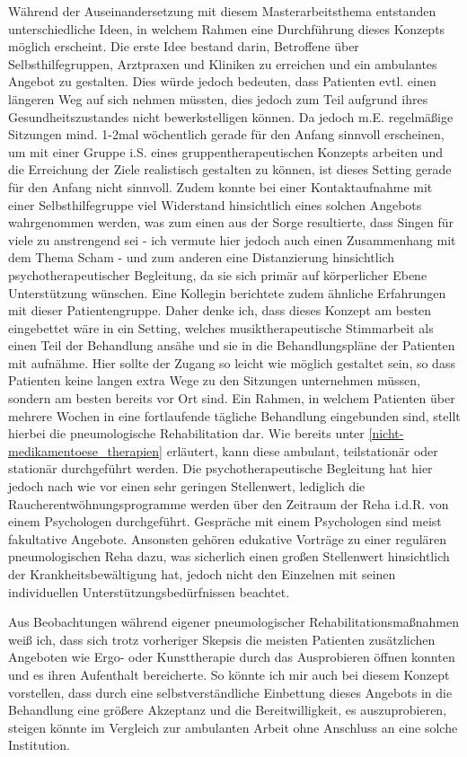 Während der Auseinandersetzung mit diesem Masterarbeitsthema entstanden unterschiedliche Ideen, in welchem Rahmen eine Durchführung dieses Konzepts möglich erscheint.
Die erste Idee bestand darin, Betroffene über Selbsthilfegruppen, Arztpraxen und Kliniken zu erreichen und ein ambulantes Angebot zu gestalten. Dies würde jedoch bedeuten, dass Patienten evtl. einen längeren Weg auf sich nehmen müssten, dies jedoch zum Teil aufgrund ihres Gesundheitszustandes nicht bewerkstelligen können. Da  jedoch m.E. regelmäßige Sitzungen mind. 1-2mal wöchentlich gerade für den Anfang sinnvoll erscheinen, um mit einer Gruppe i.S. eines gruppentherapeutischen Konzepts arbeiten und die Erreichung der Ziele realistisch gestalten zu können, ist dieses Setting gerade für den Anfang nicht sinnvoll. Zudem konnte bei einer Kontaktaufnahme mit einer Selbsthilfegruppe viel Widerstand hinsichtlich eines solchen Angebots wahrgenommen werden, was zum einen aus der Sorge resultierte, dass Singen für viele zu anstrengend sei - ich vermute hier jedoch auch einen Zusammenhang mit dem Thema Scham - und zum anderen eine Distanzierung hinsichtlich psychotherapeutischer Begleitung, da sie sich primär auf körperlicher Ebene Unterstützung wünschen. Eine Kollegin berichtete zudem ähnliche Erfahrungen mit dieser Patientengruppe. 
Daher denke ich, dass dieses Konzept am besten eingebettet wäre in ein Setting, welches musiktherapeutische Stimmarbeit als einen Teil der Behandlung ansähe und sie in die Behandlungspläne der Patienten mit aufnähme. Hier sollte der Zugang so leicht wie möglich gestaltet sein, so dass Patienten keine langen extra Wege zu den Sitzungen unternehmen müssen, sondern am besten bereits vor Ort sind. Ein Rahmen, in welchem Patienten über mehrere Wochen in eine fortlaufende tägliche Behandlung eingebunden sind, stellt hierbei die pneumologische Rehabilitation dar. Wie bereits unter \ref{nicht-medikamentoese_therapien} erläutert, kann diese ambulant, teilstationär oder stationär durchgeführt werden. Die psychotherapeutische Begleitung hat hier jedoch nach wie vor einen sehr geringen Stellenwert, lediglich die Raucherentwöhnungsprogramme werden über den Zeitraum der Reha i.d.R. von einem Psychologen durchgeführt. Gespräche mit einem Psychologen sind meist fakultative Angebote. Ansonsten gehören edukative Vorträge zu einer regulären pneumologischen Reha dazu, was sicherlich einen großen Stellenwert hinsichtlich der Krankheitsbewältigung hat, jedoch nicht den Einzelnen mit seinen individuellen Unterstützungsbedürfnissen beachtet. 

Aus Beobachtungen während eigener pneumologischer Rehabilitationsmaßnahmen weiß ich, dass sich trotz vorheriger Skepsis die meisten Patienten zusätzlichen Angeboten wie Ergo- oder Kunsttherapie durch das Ausprobieren öffnen konnten und es ihren Aufenthalt bereicherte. So könnte ich mir auch bei diesem Konzept vorstellen, dass durch eine selbstverständliche Einbettung dieses Angebots in die Behandlung eine größere Akzeptanz und die Bereitwilligkeit, es auszuprobieren, steigen könnte im Vergleich zur ambulanten Arbeit ohne Anschluss an eine solche Institution. 

